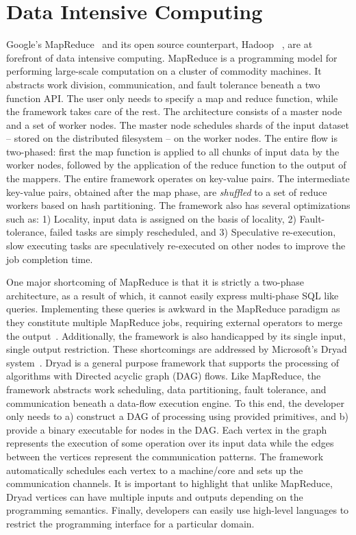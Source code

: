 \documentclass[a4paper,12pt,twoside,openright]{report}
\begin{document}
\section{Data Intensive
Computing}\label{chapter:background:section:dataIntensive}
Google's MapReduce~\cite{Dean:2004:MSD} and its open source counterpart, Hadoop
~\cite{hadoop}, are at forefront of data intensive computing. MapReduce is a
programming model for performing large-scale computation on a cluster of
commodity machines. It abstracts work division, communication, and fault
tolerance beneath a two function API. The user only needs to specify a map and
reduce function, while the framework takes care of the rest. The architecture
consists of a master node and a set of worker nodes.
The master node schedules shards of the input dataset -- stored on the
distributed filesystem -- on the worker nodes. The entire flow is two-phased:
first the map function is applied to all chunks of input data by the worker
nodes, followed by the application of the reduce function to the output of the
mappers. The entire framework operates on key-value pairs. The intermediate
key-value pairs, obtained after the map phase, are \emph{shuffled} to a set of
reduce workers based on hash partitioning. The framework also has several
optimizations such as: 1) Locality, input data is assigned on the basis of
locality, 2) Fault-tolerance, failed tasks are simply rescheduled, and 3)
Speculative re-execution, slow executing tasks are speculatively re-executed on
other nodes to improve the job completion time.

One major shortcoming of MapReduce is that it is strictly a two-phase
architecture, as a result of which, it cannot easily express multi-phase SQL
like queries. Implementing these queries is awkward in the MapReduce paradigm as
they constitute multiple MapReduce jobs, requiring external operators to merge
the output~\cite{Yang:2007:MSR}. Additionally, the framework is also handicapped
by its single input, single output restriction. These shortcomings are addressed
by Microsoft's Dryad system~\cite{Isard:2007:DDD}. Dryad is a general purpose
framework that supports the processing of algorithms with Directed acyclic graph
(DAG) flows. Like MapReduce, the framework abstracts work scheduling, data
partitioning, fault tolerance, and communication beneath a data-flow execution
engine. To this end, the developer only needs to a) construct a DAG of
processing using provided primitives, and b) provide a binary executable for
nodes in the DAG. Each vertex in the graph represents the execution of some
operation over its input data while the edges between the vertices represent the
communication patterns. The framework automatically schedules each vertex to a
machine/core and sets up the communication channels.
It is important to highlight that unlike MapReduce, Dryad vertices can have
multiple inputs and outputs depending on the programming semantics. Finally,
developers can easily use high-level languages to restrict the programming
interface for a particular domain.
\end{document}
